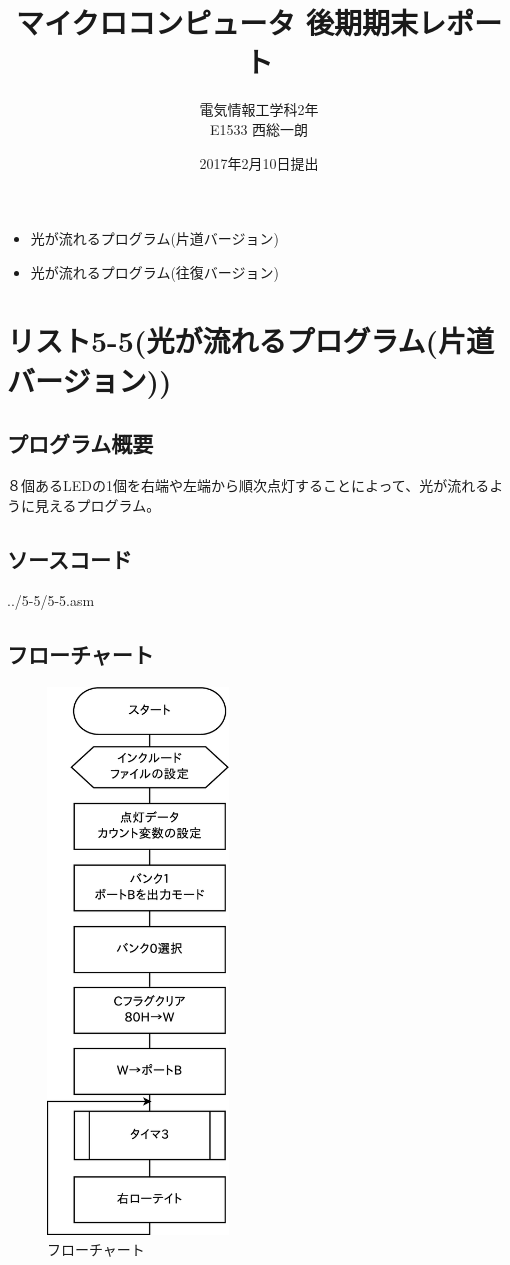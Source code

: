 \documentclass[a4paper,12pt]{ujarticle}
\begin{document}
\title{マイクロコンピュータ 後期期末レポート}
\author{電気情報工学科2年 \\ E1533 西総一朗}
\date{2017年2月10日提出}
\maketitle
\begin{itemize}
 \item 光が流れるプログラム(片道バージョン)
 \item 光が流れるプログラム(往復バージョン)
\end{itemize}
\clearpage
\tableofcontents
\clearpage
 \section{リスト5-5(光が流れるプログラム(片道バージョン))}
  \subsection{プログラム概要}
  ８個あるLEDの1個を右端や左端から順次点灯することによって、光が流れるように見えるプログラム。
  \subsection{ソースコード}
   \begin{lstinputlisting}[basicstyle=\ttfamily\footnotesize, frame=single]
   {../5-5/5-5.asm}
   \end{lstinputlisting}
  \subsection{フローチャート}
  \begin{figure}[htbp]
   \begin{center}
     \includegraphics[height=145mm]{Diagram5-5.eps}
   \end{center}
   \caption{フローチャート}
   \label{fig}
  \end{figure}
  \clearpage
\end{document}
